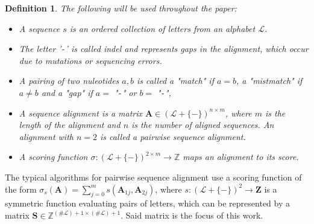 \documentclass{article}
\newtheorem{definition}{Definition}
\begin{document}
\begin{definition}
    The following will be used throughout the paper:
    \begin{itemize}
        \item A \emph{sequence} $s$ is an ordered collection of letters from
              an alphabet $\mathcal{L}$.
        \item The letter '\texttt{-}' is called \emph{indel} and represents
              gaps in the alignment, which occur due to mutations or sequencing
              errors.
      \item A pairing of two nuleotides $a, b$ is called a "\emph{match}" if $a = b$, a "\emph{mistmatch"} if $a \ne b$ and a "\emph {gap}" if $a =$ "\texttt{-}" or $b =$ "\texttt{-}",

        \item A \emph{sequence alignment} is a matrix $\mathbf A \in
                  (\mathcal{L} + \{\mathtt{-}\})^{n \times m}$, where $m$ is the
              length of the alignment and $n$ is the number of aligned sequences.
	      An alignment with $n = 2$ is called a \emph{pairwise sequence alignment.}
      \item A \emph{scoring function} $\sigma: (\mathcal{L} + \{\mathtt{-}\})^{2
                      \times m} \to \mathbb{Z}$ maps an alignment to its score.
    \end{itemize}
\end{definition}

The typical algorithms for pairwise sequence alignment use a scoring function of the form
$\sigma_s( \mathbf A )= \sum_{j=0}^m s(\mathbf A_{1j}, \mathbf A_{2j})$, where $s:
    (\mathcal L + \{\mathtt{-}\})^2 \to \mathbf{Z}$ is a symmetric function
evaluating pairs of letters, which can be represented by a matrix $\mathbf S
    \in \mathbb Z^{(\# \mathcal L) + 1 \times (\# \mathcal L) + 1}$. Said matrix is
the focus of this work.
\end{document}
